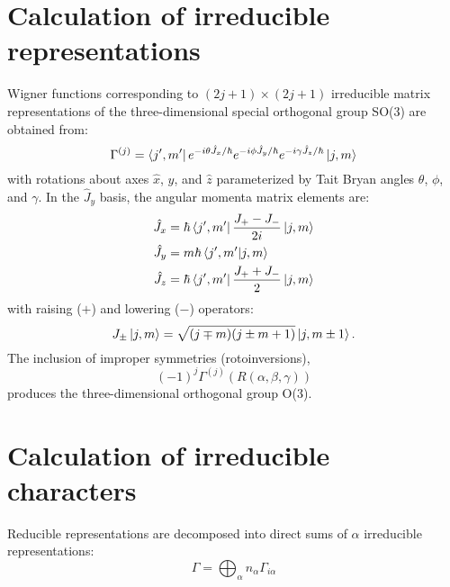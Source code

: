 \documentclass[preprint,showpacs,preprintnumbers,superscriptaddress,prb,floatfix,aps]{revtex4-1}
\begin{document}
\section{Calculation of irreducible representations}
Wigner functions corresponding to $(2j+1)\times(2j+1)$ irreducible matrix representations of the three-dimensional special orthogonal group SO(3) are obtained from:\cite{martin_electronic_2004}
\begin{equation}
\label{eq:imselfenergy}
\Gamma^{(j)} = \bra{j',m'} e^{-i\theta\hat{J}_x/\hbar} e^{-i\phi\hat{J}_y/\hbar} e^{-i\gamma\hat{J}_z/\hbar} \ket{j,m}
\end{equation}
with rotations about axes $\hat{x}$, $\hat{y}$, and $\hat{z}$ parameterized by Tait Bryan angles $\theta$, $\phi$, and $\gamma$. In the $\hat{J}_y$ basis, the angular momenta matrix elements are:\cite{shankar_fundamentals_2014}
\begin{align}
\label{eq:angular_momenta}
\hat{J}_x & = \hbar \bra{j',m'} \frac{J_{+}-J_{-}}{2i} \ket{j,m} \\
\hat{J}_y & = m \hbar \braket{j',m'}{j,m} \\
\hat{J}_z & = \hbar \bra{j',m'} \frac{J_{+}+J_{-}}{2} \ket{j,m}
\end{align}
with raising ($+$) and lowering ($-$) operators:
\begin{equation}
\label{eq:raising_lowering_operator}
J_{\pm}\ket{j,m} = \sqrt{(j\mp m)(j\pm m+1)}\ket{j,m\pm1}.
\end{equation}
The inclusion of improper symmetries (rotoinversions),\cite{sharma_general_1979,el-batanouny_symmetry_2008}
\begin{equation}
\label{eq:improper_rotation}
(-1)^{j} \Gamma^{(j)}(R\left(\alpha,\beta,\gamma\right))
\end{equation}
produces the three-dimensional orthogonal group O(3).


%
%
%
\section{Calculation of irreducible characters}
Reducible representations are decomposed into direct sums of $\alpha$ irreducible representations:
\begin{equation}
\label{eq:irrep_decomposition}
\Gamma = \bigoplus_\alpha n_\alpha \Gamma_{i\alpha}
\end{equation}
\end{document}
